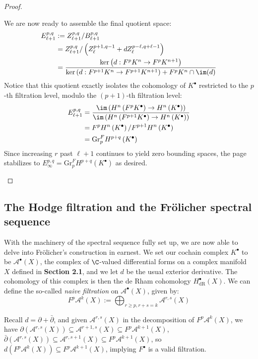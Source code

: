 \begin{proof}
\begin{enumerate}[i.]
        We are now ready to assemble the final quotient space:
        \begin{align*}
        E_{\ell+1}^{p,q} &:= Z_{\ell+1}^{p,q} /B_{\ell+1}^{p,q} \\
        &= Z_{\ell+1}^{p,q} /\left(Z_{\ell}^{p+1,q-1} + dZ_{\ell}^{p-\ell,q+\ell-1}\right) \\
        &= \frac{\ker \left(d:F^pK^n\to F^pK^{n+1}\right)}{ \ker \left(d:F^{p+1}K^n\to F^{p+1}K^{n+1}\right) +F^pK^n\cap \im (d)} 
        \end{align*}
        Notice that this quotient exactly isolates the cohomology of $K^\bullet$ restricted to the $p$-th filtration level, modulo the $(p+1)$-th filtration level:
        \begin{align*}
        E_{\ell+1}^{p,q} &= \frac{\im \left(H^n\left(F^pK^\bullet\right)\to H^n\left(K^\bullet\right)\right)}{\im \left(H^n\left(F^{p+1}K^\bullet\right)\to H^n\left(K^\bullet\right)\right)} \\
        &= F^pH^n\left(K^\bullet\right) / F^{p+1}H^n\left(K^\bullet\right) \\
        &= \mathrm{Gr}_p^FH^{p+q}\left(K^\bullet\right)
        \end{align*}
        Since increasing $r$ past $\ell+1$ continues to yield zero bounding spaces, the page stabilizes to $E_\infty^{p,q} = \mathrm{Gr}_p^FH^{p+q}\left(K^\bullet\right)$ as desired.
    \end{enumerate}
\end{proof}

\subsection{The Hodge filtration and the Fr\"olicher spectral sequence}
With the machinery of the spectral sequence fully set up, we are now able to delve into Fr\"olicher's construction in earnest. We set our cochain complex $K^\bullet$ to be $\mathcal{A}^\bullet(X)$, the complex of $\C$-valued differential forms on a complex manifold $X$ defined in \textbf{Section 2.1}, and we let $d$ be the usual exterior derivative. The cohomology of this complex is then the de Rham cohomology $H^\bullet_\mathrm{dR}(X)$. We can define the so-called \emph{naive filtration} on $\mathcal{A}^\bullet(X)$, given by:
$$
F^p\mathcal{A}^k(X) :=\bigoplus_{r\geq p, r+s=k} \mathcal{A}^{r,s}(X)
$$

\noindent Recall $d=\partial + \bar\partial$, and given $\mathcal{A}^{r,s}(X)$ in the decomposition of $F^p\mathcal{A}^k(X)$, we have $\partial\left(\mathcal{A}^{r,s}(X)\right) \subseteq \mathcal{A}^{r+1,s}(X) \subseteq F^p \mathcal{A}^{k+1}(X)$, $\bar\partial\left(\mathcal{A}^{r,s}(X)\right) \subseteq \mathcal{A}^{r,s+1}(X) \subseteq F^p \mathcal{A}^{k+1}(X)$, so $d\left(F^p\mathcal{A}^k(X)\right) \subseteq F^p \mathcal{A}^{k+1}(X)$, implying $F^\bullet$ is a valid filtration. 

